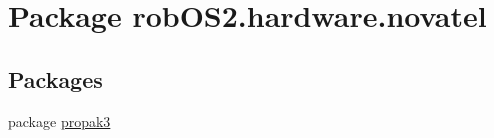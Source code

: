 \hypertarget{namespacerob_o_s2_1_1hardware_1_1novatel}{
\section{Package robOS2.hardware.novatel}
\label{namespacerob_o_s2_1_1hardware_1_1novatel}
}
\subsection*{Packages}
\begin{DoxyCompactItemize}
\item 
package \hyperlink{namespacerob_o_s2_1_1hardware_1_1novatel_1_1propak3}{propak3}
\end{DoxyCompactItemize}
